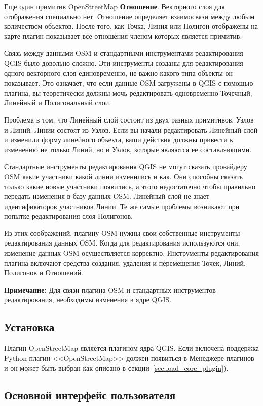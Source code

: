 Еще один примитив OpenStreetMap \textbf{Отношение}. Векторного слоя для
отображения специально нет. Отношение определяет взаимосвязи между любым
количеством объектов. После того, как Точка, Линия или Полигон отображены
на карте плагин показывает все отношения членом которых является примитив.

Связь между данными OSM и стандартными инструментами редактирования QGIS
было довольно сложно. Эти инструменты созданы для редактирования одного
векторного слоя единовременно, не важно какого типа объекты он показывает.
Это означает, что если данные OSM загружены в QGIS с помощью плагина, вы
теоретически должны мочь редактировать одновременно Точечный, Линейный и
Полигональный слои.

Проблема в том, что Линейный слой состоит из двух разных примитивов, Узлов
и Линий. Линии состоят из Узлов. Если вы начали редактировать Линейный
слой и изменили форму линейного объекта, ваши действия должны привести к
изменению не только Линий, но и Узлов, которые являются ее составляющими.

Стандартные инструменты редактирования QGIS не могут сказать провайдеру
OSM какие участники какой линии изменились и как. Они способны сказать
только какие новые участники появились, а этого недостаточно чтобы
правильно передать изменения в базу данных OSM. Линейный слой не знает
идентификаторов участников Линии. Те же самые проблемы возникают при
попытке редактирования слоя Полигонов.

Из этих соображений, плагину OSM нужны свои собственные инструменты
редактирования данных OSM. Когда для редактирования используются они,
изменение данных OSM осуществляется корректно. Инструменты редактирования
плагина включают средства создания, удаления и перемещения Точек, Линий,
Полигонов и Отношений.

\textbf{Примечание:} Для связи плагина OSM и стандартных инструментов
редактирования, необходимы изменения в ядре QGIS.

\subsection{Установка}

Плагин OpenStreetMap является плагином ядра QGIS. Если включена поддержка
Python плагин <<OpenStreetMap>> должен появиться в Менеджере плагинов и
он может быть выбран как описано в секции~\ref{sec:load_core_plugin}).

\subsection{Основной интерфейс пользователя}

